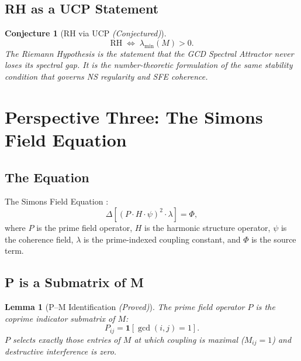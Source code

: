 \documentclass[12pt]{article}
\newtheorem{lemma}[theorem]{Lemma}
\newtheorem{conjecture}[theorem]{Conjecture}
\begin{document}
\subsection{RH as a UCP Statement}

\begin{conjecture}[RH via UCP \emph{(Conjectured)}]
\label{conj:RH}
\begin{equation}
\boxed{
\text{RH}
\;\Longleftrightarrow\;
\lambda_{\min}(M) > 0.
}
\label{eq:RHreduction}
\end{equation}
The Riemann Hypothesis is the statement that the GCD Spectral
Attractor never loses its spectral gap. It is the
number-theoretic formulation of the same stability condition
that governs NS regularity and SFE coherence.
\end{conjecture}

\section{Perspective Three: The Simons Field Equation}

\subsection{The Equation}

The Simons Field Equation \cite{SFE2025}:
\begin{equation}
\Delta\!\left[(P \cdot H \cdot \psi)^2 \cdot \lambda\right] = \Phi,
\label{eq:SFE}
\end{equation}
where $P$ is the prime field operator, $H$ is the harmonic
structure operator, $\psi$ is the coherence field, $\lambda$
is the prime-indexed coupling constant, and $\Phi$ is the
source term.

\subsection{P is a Submatrix of M}

\begin{lemma}[P--M Identification \emph{(Proved)}]
\label{lem:PM}
The prime field operator $P$ is the coprime indicator submatrix of $M$:
\begin{equation}
P_{ij} = \mathbf{1}[\gcd(i,j) = 1].
\label{eq:P}
\end{equation}
$P$ selects exactly those entries of $M$ at which coupling
is maximal ($M_{ij} = 1$) and destructive interference is zero.
\end{lemma}
\end{document}
